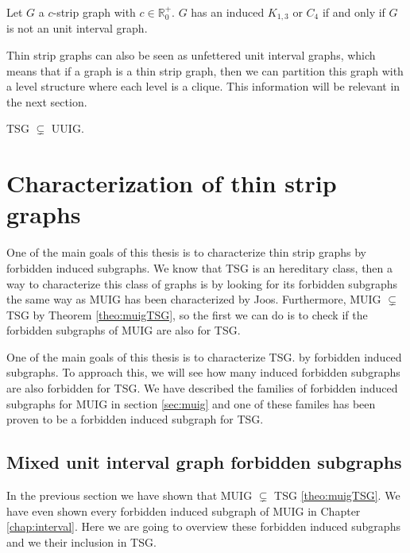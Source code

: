 \begin{theorem}
  \label{theo:induced_TSG}
  Let $G$ a $c$-strip graph with $c \in \mathbb{R}_0^+$. $G$ has an induced $K_{1,3}$ or $C_4$ if and only if $G$ is not an unit interval graph.
\end{theorem}

Thin strip graphs can also be seen as unfettered unit interval graphs, which means that if a graph is a thin strip graph, then we can partition this graph with a level structure where each level is a clique. This information will be relevant in the next section.

\begin{theorem}
  TSG $\subsetneq$ UUIG.
\end{theorem}



\section{Characterization of thin strip graphs}

One of the main goals of this thesis is to characterize thin strip graphs by forbidden induced subgraphs. We know that TSG is an hereditary class, then a way to characterize this class of graphs is by looking for its forbidden subgraphs the same way as MUIG has been characterized by Joos. Furthermore, MUIG $\subsetneq$ TSG by Theorem \ref{theo:muigTSG}, so the first we can do is to check if the forbidden subgraphs of MUIG are also for TSG.

One of the main goals of this thesis is to characterize TSG. by forbidden induced subgraphs. To approach this, we will see how many induced forbidden subgraphs are also forbidden for TSG. We have described the families of forbidden induced subgraphs for MUIG in section \ref{sec:muig} and one of these familes has been proven to be a forbidden induced subgraph for TSG.

\subsection{Mixed unit interval graph forbidden subgraphs}

In the previous section we have shown that MUIG $\subsetneq$ TSG \ref{theo:muigTSG}. We have even shown every forbidden induced subgraph of MUIG in Chapter \ref{chap:interval}. Here we are going to overview these forbidden induced subgraphs and we their inclusion in TSG. 

